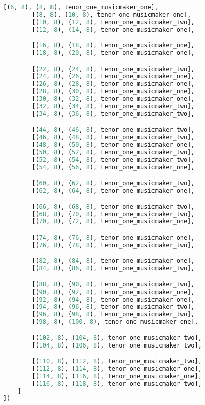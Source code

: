 \begin{lstlisting}[language=Python, caption=Invocation Source Code]
        [(6, 8), (8, 8), tenor_one_musicmaker_one],
        [(8, 8), (10, 8), tenor_one_musicmaker_one],
        [(10, 8), (12, 8), tenor_one_musicmaker_two],
        [(12, 8), (14, 8), tenor_one_musicmaker_one],

        [(16, 8), (18, 8), tenor_one_musicmaker_one],
        [(18, 8), (20, 8), tenor_one_musicmaker_one],

        [(22, 8), (24, 8), tenor_one_musicmaker_two],
        [(24, 8), (26, 8), tenor_one_musicmaker_one],
        [(26, 8), (28, 8), tenor_one_musicmaker_one],
        [(28, 8), (30, 8), tenor_one_musicmaker_one],
        [(30, 8), (32, 8), tenor_one_musicmaker_one],
        [(32, 8), (34, 8), tenor_one_musicmaker_two],
        [(34, 8), (36, 8), tenor_one_musicmaker_two],

        [(44, 8), (46, 8), tenor_one_musicmaker_two],
        [(46, 8), (48, 8), tenor_one_musicmaker_two],
        [(48, 8), (50, 8), tenor_one_musicmaker_one],
        [(50, 8), (52, 8), tenor_one_musicmaker_two],
        [(52, 8), (54, 8), tenor_one_musicmaker_two],
        [(54, 8), (56, 8), tenor_one_musicmaker_one],

        [(60, 8), (62, 8), tenor_one_musicmaker_two],
        [(62, 8), (64, 8), tenor_one_musicmaker_one],

        [(66, 8), (68, 8), tenor_one_musicmaker_two],
        [(68, 8), (70, 8), tenor_one_musicmaker_two],
        [(70, 8), (72, 8), tenor_one_musicmaker_one],

        [(74, 8), (76, 8), tenor_one_musicmaker_one],
        [(76, 8), (78, 8), tenor_one_musicmaker_two],

        [(82, 8), (84, 8), tenor_one_musicmaker_one],
        [(84, 8), (86, 8), tenor_one_musicmaker_two],

        [(88, 8), (90, 8), tenor_one_musicmaker_two],
        [(90, 8), (92, 8), tenor_one_musicmaker_one],
        [(92, 8), (94, 8), tenor_one_musicmaker_one],
        [(94, 8), (96, 8), tenor_one_musicmaker_two],
        [(96, 8), (98, 8), tenor_one_musicmaker_two],
        [(98, 8), (100, 8), tenor_one_musicmaker_one],

        [(102, 8), (104, 8), tenor_one_musicmaker_two],
        [(104, 8), (106, 8), tenor_one_musicmaker_two],

        [(110, 8), (112, 8), tenor_one_musicmaker_two],
        [(112, 8), (114, 8), tenor_one_musicmaker_one],
        [(114, 8), (116, 8), tenor_one_musicmaker_one],
        [(116, 8), (118, 8), tenor_one_musicmaker_two],
    ]
])


\end{lstlisting}
